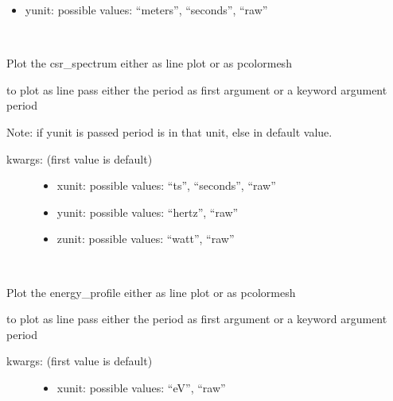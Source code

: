\documentclass[letterpaper,10pt,openany,oneside,english]{sphinxmanual}
\begin{document}
\begin{fulllineitems}
\begin{fulllineitems}
\begin{description}
\begin{itemize}
\item {} 
yunit: possible values: “meters”, “seconds”, “raw”

\end{itemize}

\end{description}

\end{fulllineitems}


\begin{fulllineitems}
\label{\detokenize{plots:plots.SimplePlotter.csr_spectrum}}~
\begin{DUlineblock}{0em}
\item[] Plot the csr\_spectrum either as line plot or as pcolormesh  
\item[] to plot as line pass either the period as first argument or a keyword argument period  
\item[] Note: if yunit is passed period is in that unit, else in default value.  
\end{DUlineblock}
\begin{description}
\item[{kwargs: (first value is default)  }] \leavevmode\begin{itemize}
\item {} 
xunit: possible values: “ts”, “seconds”, “raw”

\item {} 
yunit: possible values: “hertz”, “raw”

\item {} 
zunit: possible values: “watt”, “raw”

\end{itemize}

\end{description}

\end{fulllineitems}


\begin{fulllineitems}
\label{\detokenize{plots:plots.SimplePlotter.energy_profile}}~
\begin{DUlineblock}{0em}
\item[] Plot the energy\_profile either as line plot or as pcolormesh  
\item[] to plot as line pass either the period as first argument or a keyword argument period  
\end{DUlineblock}
\begin{description}
\item[{kwargs: (first value is default)  }] \leavevmode\begin{itemize}
\item {} 
xunit: possible values: “eV”, “raw”


\end{itemize}
\end{description}
\end{fulllineitems}
\end{fulllineitems}
\end{document}
